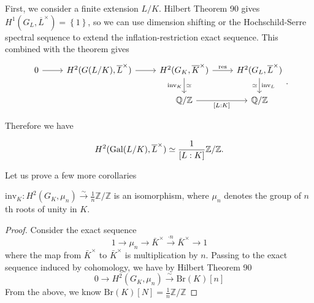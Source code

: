 First, we consider a finite extension \(L / K\). 
Hilbert Theorem 90 gives 
$H^{1}(G_L,\overline{L}^{\times})=\left\lbrace1\right\rbrace$, 
so we can use dimension shifting or the Hochschild-Serre spectral sequence 
to extend the inflation-restriction exact sequence. 
This combined with the theorem gives
\[
\begin{tikzcd}
	0\ar[r] & H^{2}(G(L/K),\overline{L}^{\times})\ar[r] & H^{2}(G_K,\overline{K}^{\times})\ar{r}{\res}\ar[d,"\inv_K"',"\simeq"] & H^{2}(G_L,\overline{L}^{\times})\ar[d,"\inv_L","\simeq"']\\
		& & \QQ/\ZZ\ar{r}[swap]{[L:K]} & \QQ/\ZZ
\end{tikzcd}
.\] 

Therefore we have
\begin{corollary} \coproof
	\[
		H^{2}(\operatorname{Gal}(L/K),\overline{L}^{\times})
		\simeq\frac{1}{[L:K]}\mathbb{Z}/\mathbb{Z}.
	\]
\end{corollary}

Let us prove a few more corollaries
\begin{corollary} \coproof
$\text{inv}_K: H^2(G_K, \mu_n) \xrightarrow{\sim} 
\frac{1}{n}\mathbb{Z}/\mathbb{Z}$ is an isomorphism, where $\mu_n$ denotes the group of $n$th roots of unity in $K$.
\end{corollary}
\begin{proof}
Consider the exact sequence 
$$1\rightarrow \mu_n\rightarrow 
\bar{K}^\times\xrightarrow{\cdot n}\bar{K}^\times\rightarrow 1$$ 
where the map from 
$\bar{K}^\times$ 
to $\bar{K}^\times$ 
is multiplication by $n$. 
Passing to the exact sequence induced by cohomology, we have 
by Hilbert Theorem 90
$$0\rightarrow H^2(G_K,\mu_n)\xrightarrow{\sim} \text{Br}(K)[n]$$ 
From the above, we know $\text{Br}(K)[N]=\frac{1}{n}\mathbb{Z}/\mathbb{Z}$
\end{proof}

%
%
%

